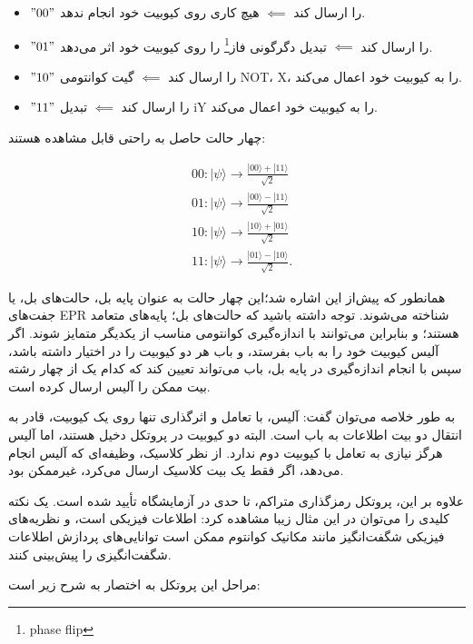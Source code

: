 \documentclass{book}
\begin{document}
\begin{itemize}
	\item  $"00"$ را ارسال کند $\impliedby$ هیچ کاری روی کیوبیت خود انجام ندهد.
	\item $"01"$ را ارسال کند $\impliedby$ تبدیل دگرگونی فاز\footnote{phase flip} را روی کیوبیت خود اثر می‌دهد.
	\item  $"10"$ را ارسال کند $\impliedby$ گیت کوانتومی NOT، X، را به کیوبیت خود اعمال می‌کند.
	\item  $"11"$ را ارسال کند $\impliedby$ تبدیل iY را به کیوبیت خود اعمال می‌کند.
\end{itemize}
چهار حالت حاصل به راحتی قابل مشاهده هستند:
\begin{center}
$$\begin{aligned}
	& 00:|\psi\rangle \rightarrow \frac{|00\rangle+|11\rangle}{\sqrt{2}} \\
	& 01:|\psi\rangle \rightarrow \frac{|00\rangle-|11\rangle}{\sqrt{2}} \\
	& 10:|\psi\rangle \rightarrow \frac{|10\rangle+|01\rangle}{\sqrt{2}} \\
	& 11:|\psi\rangle \rightarrow \frac{|01\rangle-|10\rangle}{\sqrt{2}} .
\end{aligned}$$	
\end{center}

همانطور که پیش‌از این اشاره شد؛این چهار حالت به عنوان پایه بل، حالت‌های بل، یا جفت‌های EPR شناخته می‌شوند.
 توجه داشته باشید که حالت‌های بل؛ پایه‌های متعامد هستند؛ و بنابراین می‌توانند با اندازه‌گیری کوانتومی مناسب از یکدیگر متمایز شوند. اگر آلیس کیوبیت خود را به باب بفرستد، و باب هر دو کیوبیت را در اختیار داشته باشد، سپس با انجام اندازه‌گیری در پایه بل، باب می‌تواند تعیین کند که کدام یک از چهار رشته بیت ممکن را آلیس ارسال کرده است.

به طور خلاصه می‌توان گفت:
 آلیس، با تعامل و اثرگذاری تنها روی یک کیوبیت، قادر به انتقال دو بیت اطلاعات به باب است. البته دو کیوبیت در پروتکل دخیل هستند، اما آلیس هرگز نیازی به تعامل با کیوبیت دوم ندارد. از نظر کلاسیک، وظیفه‌ای که آلیس انجام می‌دهد، اگر فقط یک بیت کلاسیک ارسال می‌کرد، غیرممکن بود.

علاوه بر این، پروتکل رمزگذاری متراکم، تا حدی در آزمایشگاه تأیید شده است.  یک نکته کلیدی را می‌توان در این مثال زیبا مشاهده کرد: اطلاعات فیزیکی است، و نظریه‌های فیزیکی شگفت‌انگیز مانند مکانیک کوانتوم ممکن است توانایی‌های پردازش اطلاعات شگفت‌انگیزی را پیش‌بینی کنند.

مراحل این پروتکل به اختصار به شرح زیر است:\\
\end{document}
